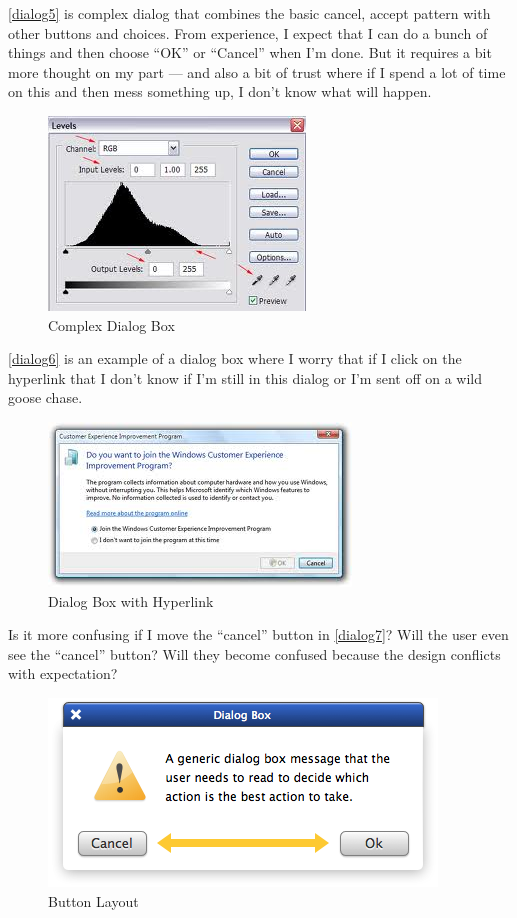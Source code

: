  \autoref{dialog5}  is complex dialog that combines the basic cancel, accept pattern with other buttons and choices. From experience, I expect that I can do a bunch of things and then choose ``OK'' or ``Cancel'' when I'm done. But it requires a bit more thought on my part --- and also a bit of trust where if I spend a lot of time on this and then mess something up, I don't know what will happen.


\begin{figure}
\centerline{
\includegraphics[scale=.5]{chapter8.tex/dialog5}
}
\caption{Complex Dialog Box}
\label{dialog5}
\end{figure}


 \autoref{dialog6}  is an example of a dialog box where I worry that if I click on the hyperlink that I don't know if I'm still in this dialog or I'm sent off on a wild goose chase.


\begin{figure}
\centerline{
\includegraphics[scale=.5]{chapter8.tex/dialog6}
}
\caption{Dialog Box with Hyperlink}
\label{dialog6}
\end{figure}


Is it more confusing if I move the ``cancel'' button in  \autoref{dialog7}?  Will the user even see the ``cancel'' button? Will they become confused because the design conflicts with expectation?


\begin{figure}
\centerline{
\includegraphics[scale=.5]{chapter8.tex/dialog7}
}
\caption{Button Layout}
\label{dialog7}
\end{figure}


